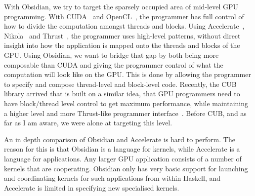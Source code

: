 \documentclass[a4paper]{book}
\begin{document}
With Obsidian, we try to target the sparsely occupied area of mid-level GPU programming. With 
CUDA~\citet{wwwcuda} and OpenCL~\citet{OpenCL}, the programmer has full control of how to divide 
the computation amongst threads and blocks. Using Accelerate~\citet{ACCELERATEDAMP11}, 
Nikola~\citet{NIKOLA} and Thrust~\citet{THRUST}, the programmer uses high-level patterns, 
without direct insight into how the application is mapped onto the threads and blocks of 
the GPU. Using Obsidian, we want to bridge that gap by both being more composable than 
CUDA and giving the programmer control of what the computation will look like on the GPU. 
This is done by allowing the programmer to specify and compose thread-level and block-level 
code. Recently, the CUB library arrived that is built on a similar idea, that GPU programmers 
need to have block/thread level control to get maximum performance, while maintaining a 
higher level and more Thrust-like programmer interface~\citet{CUB}. Before CUB, and as 
far as I am aware, we were alone at targeting this level.  

An in depth comparison of Obsidian and Accelerate is hard to perform. The reason for 
this is that Obsidian is a language for kernels, while Accelerate is a language for 
applications. Any larger GPU application consists of a number of kernels that 
are cooperating. Obsidian only has very basic support for launching and coordinating 
kernels for such applications from within Haskell, and Accelerate is limited in specifying 
new specialised kernels. 
\end{document}
